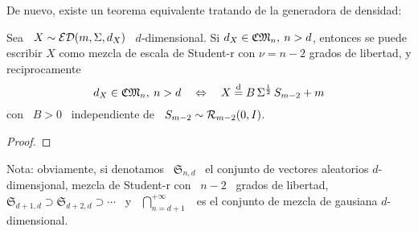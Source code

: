 De nuevo, existe un teorema equivalente tratando de la generadora de densidad:
%

%
\begin{teorema}
%
  Sea \  $X \sim \mathcal{ED}(m,\Sigma,d_X)$  \ $d$-dimensional. Si  $d_X \in
  \mathfrak{CM}_n, \: n  > d$, entonces se  puede escribir $X$ como mezcla  de escala de
  Student-r con $\nu = n-2$ grados de libertad, y reciprocamente
  \[
  d_X \in  \mathfrak{CM}_n, \:  n > d  \quad \Leftrightarrow  \quad X \stackrel{\mathrm{d}}{=}  B \,
  \Sigma^{\frac12} \, S_{m-2} + m
  \]
  con \ $B > 0$ \ independiente de \ $S_{m-2} \sim \mathcal{R}_{m-2}(0,I)$.
\end{teorema}
%
\begin{proof}
\end{proof}

Nota: obviamente, si denotamos \  $\mathfrak{S}_{n,d}$ \ el conjunto de vectores
aleatorios  $d$-dimensjonal,  mezcla  de  Student-r  con \  $n-2$  \  grados  de
libertad, $\mathfrak{S}_{d+1,d} \supset \mathfrak{S}_{d+2,d} \supset \cdots$ \ y
\  $\displaystyle  \bigcap_{n=d+1}^{+\infty}$ \  es  el  conjunto  de mezcla  de
gausiana $d$-dimensional.


